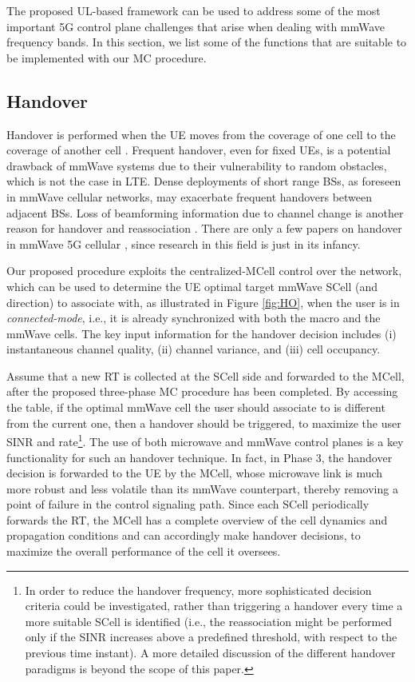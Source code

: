 \documentclass[conference,a4paper]{IEEEtran}
\begin{document}
The proposed UL-based framework can be used to address some of the most important 5G control plane challenges that arise when dealing with mmWave frequency bands. In this section, we list some of the functions that are suitable to be implemented with our MC procedure.


\subsection{Handover}
\label{sec:HO}




Handover  is performed when the UE moves from the coverage of one cell to the coverage of another cell \cite{LTE_book}. Frequent handover, even for fixed UEs, is a potential drawback of mmWave systems due to their vulnerability to random obstacles, which is not the case in LTE. Dense deployments of short range BSs, as foreseen in mmWave cellular networks, may exacerbate frequent handovers between adjacent BSs. Loss of beamforming information due to channel change is another reason for handover and reassociation \cite{zorzi}. There are only a few papers on handover in mmWave 5G cellular \cite{handoff,HO_train,HO_het,HO_het_2}, since research in this field is just in its infancy.


Our proposed procedure exploits the centralized-MCell control over the network, which can be used to determine the UE optimal target mmWave SCell (and direction) to associate with, as illustrated in Figure \ref{fig:HO}, when the user is in \emph{connected-mode}, i.e., it is already synchronized with both the macro and the mmWave cells. The key input information for the handover decision includes (i) instantaneous channel quality, (ii)  channel variance, and (iii) cell occupancy.

Assume that a new RT is collected at the SCell side and forwarded to the MCell, after the proposed three-phase MC procedure has been completed. 
By accessing the table, if the optimal mmWave cell the user should associate to is different from the current one, then a handover should be triggered, to maximize the user SINR and rate\footnote{In order to reduce the handover frequency, more sophisticated decision criteria could be investigated, rather than triggering a handover every time a more suitable SCell is identified (i.e., the reassociation might be performed only if the SINR increases above a predefined threshold, with respect to the previous time instant). A more detailed discussion of the different handover paradigms is beyond the scope of this paper.}. 
The use of both microwave and mmWave control planes is a key functionality for such an handover technique. 
In fact, in Phase 3, the handover decision is forwarded to the UE by the MCell, whose microwave link is much more robust and less volatile than its mmWave counterpart, thereby removing a point of failure in the control signaling path. Since each SCell periodically forwards the RT, the MCell has a complete overview of the cell dynamics and propagation conditions and can accordingly make handover decisions, to maximize the overall performance of the cell it oversees.
\end{document}
